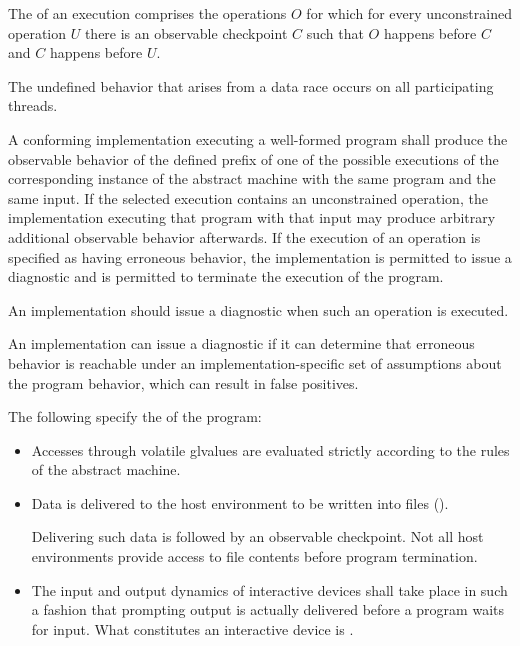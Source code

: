 \pnum
{}%
%
The  of an execution
comprises the operations $O$
for which for every unconstrained operation $U$
there is an observable checkpoint $C$
such that $O$ happens before $C$ and
$C$ happens before $U$.

\begin{note}
The undefined behavior that arises from a data race
occurs on all participating threads.
\end{note}

A conforming implementation executing a well-formed program shall
produce the observable behavior
of the defined prefix
of one of the possible executions
of the corresponding instance
of the abstract machine with the
same program and the same input.
%
If the selected execution contains an unconstrained operation,
the implementation executing that program with that input
may produce arbitrary additional observable behavior afterwards.
If the execution of an operation is specified as having erroneous behavior,
the implementation is permitted to issue a diagnostic and
is permitted to terminate the execution of the program.

\pnum
\recommended
An implementation should issue a diagnostic when such an operation is executed.
\begin{note}
An implementation can issue a diagnostic
if it can determine that erroneous behavior is reachable
under an implementation-specific set of assumptions about the program behavior,
which can result in false positives.
\end{note}

\pnum
{}%
The following specify the
of the program:
\begin{itemize}
\item
Accesses through volatile glvalues are evaluated strictly according to the
rules of the abstract machine.
\item
Data is delivered to the host environment to be written into files ().

\begin{note}
Delivering such data
is followed by an observable checkpoint.
Not all host environments provide access to file contents before program termination.
\end{note}

\item
The input and output dynamics of interactive devices shall take
place in such a fashion that prompting output is actually delivered before a program waits for input. What constitutes an interactive device is
.
\end{itemize}

